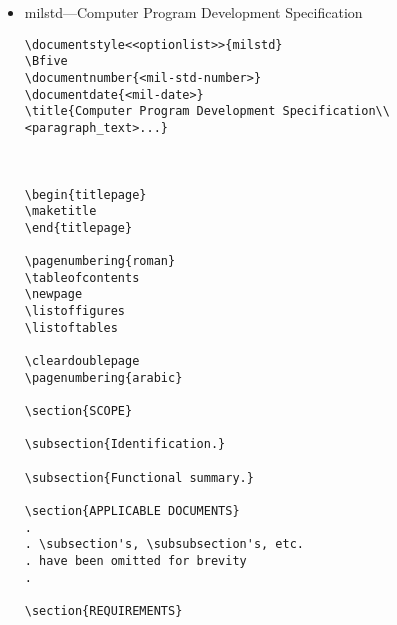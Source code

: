 \begin{itemize}
\begin{small}
\begin{verbatim}
\end{verbatim}
\end{small}

\item milstd---Computer Program Development Specification 

\begin{small}
\begin{verbatim}
\documentstyle<<optionlist>>{milstd}
\Bfive
\documentnumber{<mil-std-number>}
\documentdate{<mil-date>}
\title{Computer Program Development Specification\\
<paragraph_text>...}



\begin{titlepage}
\maketitle
\end{titlepage}

\pagenumbering{roman}
\tableofcontents
\newpage
\listoffigures
\listoftables

\cleardoublepage
\pagenumbering{arabic}

\section{SCOPE}

\subsection{Identification.}

\subsection{Functional summary.}

\section{APPLICABLE DOCUMENTS}
.
. \subsection's, \subsubsection's, etc. 
. have been omitted for brevity
.  

\section{REQUIREMENTS}


\end{verbatim}
\end{small}
\end{itemize}
